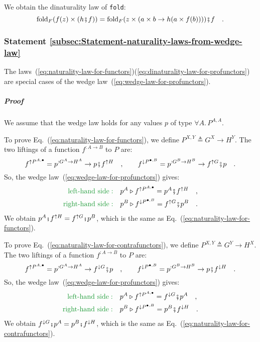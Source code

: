 We obtain the dinaturality law of \lstinline!fold!:
\[
\text{fold}_{F}(f(z)\times(h\bef f))=\text{fold}_{F}(z\times(a\times b\rightarrow h(a\times f(b))))\bef f\quad.
\]


\subsubsection{Statement \label{subsec:Statement-naturality-laws-from-wedge-law}\ref{subsec:Statement-naturality-laws-from-wedge-law}}

The laws~(\ref{eq:naturality-law-for-functors})\textendash (\ref{eq:dinaturality-law-for-profunctors})
are special cases of the wedge law~(\ref{eq:wedge-law-for-profunctors}). 

\subparagraph{Proof}

We assume that the wedge law holds for any values $p$ of type $\forall A.\,P^{A,A}$.

To prove Eq.~(\ref{eq:naturality-law-for-functors}), we define $P^{X,Y}\triangleq G^{X}\rightarrow H^{Y}$.
The two liftings of a function $f^{:A\rightarrow B}$ to $P$ are:
\[
f^{\uparrow P^{A,\bullet}}=p^{:G^{A}\rightarrow H^{A}}\rightarrow p\bef f^{\uparrow H}\quad,\quad\quad f^{\downarrow P^{\bullet,B}}=p^{:G^{B}\rightarrow H^{B}}\rightarrow f^{\uparrow G}\bef p\quad.
\]
So, the wedge law~(\ref{eq:wedge-law-for-profunctors}) gives:
\begin{align*}
{\color{greenunder}\text{left-hand side}:}\quad & p^{A}\triangleright f^{\uparrow P^{A,\bullet}}=p^{A}\bef f^{\uparrow H}\quad,\\
{\color{greenunder}\text{right-hand side}:}\quad & p^{B}\triangleright f^{\downarrow P^{\bullet,B}}=f^{\uparrow G}\bef p^{B}\quad.
\end{align*}
We obtain $p^{A}\bef f^{\uparrow H}=f^{\uparrow G}\bef p^{B}$, which
is the same as Eq.~(\ref{eq:naturality-law-for-functors}).

To prove Eq.~(\ref{eq:naturality-law-for-contrafunctors}), we define
$P^{X,Y}\triangleq G^{Y}\rightarrow H^{X}$. The two liftings of a
function $f^{:A\rightarrow B}$ to $P$ are:
\[
f^{\uparrow P^{A,\bullet}}=p^{:G^{A}\rightarrow H^{A}}\rightarrow f^{\downarrow G}\bef p\quad,\quad\quad f^{\downarrow P^{\bullet,B}}=p^{:G^{B}\rightarrow H^{B}}\rightarrow p\bef f^{\downarrow H}\quad.
\]
So, the wedge law~(\ref{eq:wedge-law-for-profunctors}) gives:
\begin{align*}
{\color{greenunder}\text{left-hand side}:}\quad & p^{A}\triangleright f^{\uparrow P^{A,\bullet}}=f^{\downarrow G}\bef p^{A}\quad,\\
{\color{greenunder}\text{right-hand side}:}\quad & p^{B}\triangleright f^{\downarrow P^{\bullet,B}}=p^{B}\bef f^{\downarrow H}\quad.
\end{align*}
We obtain $f^{\downarrow G}\bef p^{A}=p^{B}\bef f^{\downarrow H}$,
which is the same as Eq.~(\ref{eq:naturality-law-for-contrafunctors}).

